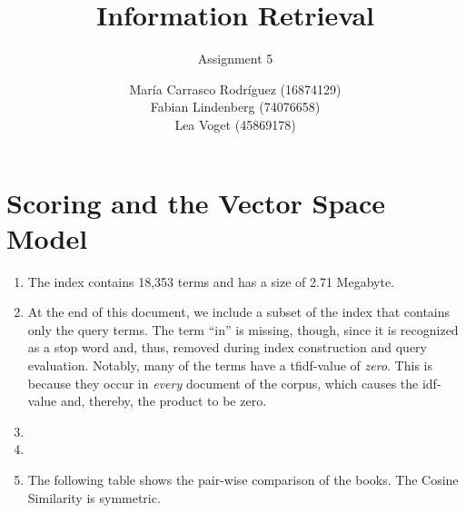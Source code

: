 \documentclass[a4paper,11pt,oneside]{book}
\title{Information Retrieval }
\subtitle{Assignment 5}
\author{ María Carrasco Rodríguez (16874129) \\
		Fabian Lindenberg (74076658)\\
		Lea Voget (45869178)}
\begin{document}
\kostspieligmaketitle

\setcounter{chapter}{2}

\chapter{Scoring and the Vector Space Model}
 

\begin{enumerate}
	\renewcommand{\labelenumi}{\Roman{enumi})}
	\item The index contains 18,353 terms and has a size of 2.71 Megabyte.
	\item At the end of this document, we include a subset of the index that contains only the query terms. The term ``in'' is missing, though, since it is recognized as a stop word and, thus, removed during index construction and query evaluation. Notably, many of the terms have a tfidf-value of \emph{zero}. This is because they occur in \emph{every} document of the corpus, which causes the idf-value and, thereby, the product to be zero. 
	
		\item
		\item
		\clearpage
		\item The following table shows the pair-wise comparison of the books. The Cosine Similarity is symmetric.
		

\end{enumerate}
\end{document}
